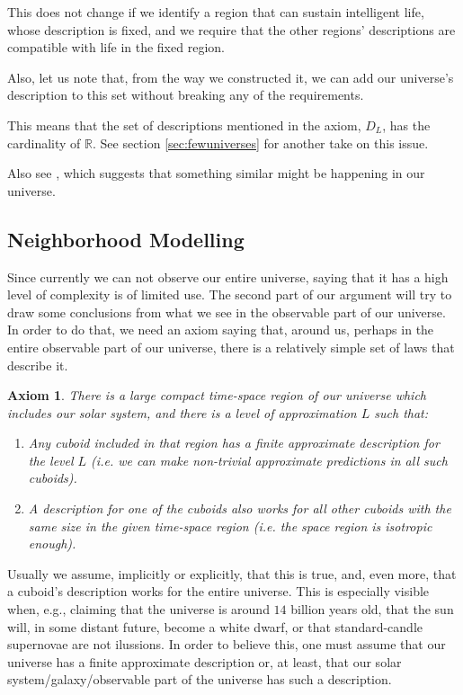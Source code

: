 \documentclass[a4paper
]{article}
\def\reale{\mathbb{R}}
\def\descriptions{D_L}
\newtheorem{axiom}{Axiom}
\begin{document}
This does not change if we identify a region that can sustain intelligent life,
whose description is fixed,
and we require that the other regions' descriptions are compatible with life
in the fixed region.

Also, let us note that, from the way we constructed it, we can add our
universe's description to this set without breaking any of the requirements.

This means that the set of descriptions mentioned in the axiom,
$\descriptions$, has the cardinality of $\reale$. See section
\ref{sec:fewuniverses} for another take on this issue.

Also see \parencite{Manson2003}, which suggests that something similar
might be happening in our universe.

\subsection{Neighborhood Modelling}

Since currently we can not observe our entire universe, saying that it has a
high level of complexity is of limited use.
The second part of our argument will try to draw some conclusions from
what we see in the observable part of our universe.
In order to do that, we need an axiom saying that, around us, perhaps in the
entire observable part of our universe, there is a relatively simple
set of laws that describe it.

\begin{axiom}\label{ax:finiteneighborhood}
  There is a large compact time-space region of our universe which
  includes our solar
  system, and there is a level of approximation $L$ such that:
  \begin{enumerate}
    \item Any cuboid included in that region has a finite approximate
          description for the level $L$ (i.e. we can make non-trivial
          approximate predictions in all such cuboids).
    \item A description for one of the cuboids also works for all other
          cuboids with the same size in the given time-space region
          (i.e. the space region is isotropic enough).
  \end{enumerate}
\end{axiom}

Usually we assume, implicitly or explicitly,
that this is true, and, even more, that a cuboid's description works
for the entire universe.
This is especially visible when, e.g., claiming
that the universe is around $14$ billion years old, that the sun will,
in some distant future, become a white dwarf, or that standard-candle supernovae
are not ilussions.
In order to believe this, one must assume that our universe has a
finite approximate description or, at least, that our
solar system/galaxy/observable part of the universe has such a description.
\end{document}
